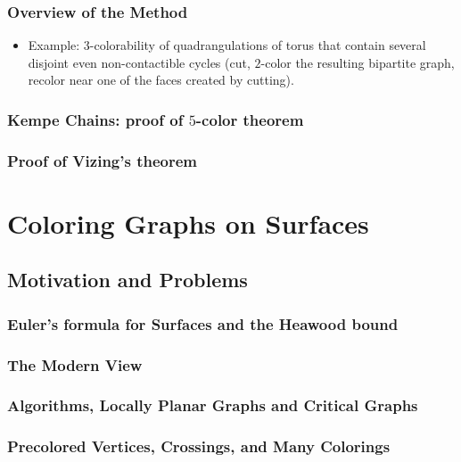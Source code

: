 \documentclass[12pt,twoside,openright,a4paper]{book}
\begin{document}
\section{Overview of the Method}

\begin{itemize}
\item Example: 3-colorability of quadrangulations of torus that contain several disjoint even non-contactible cycles
(cut, $2$-color the resulting bipartite graph, recolor near one of the faces created by cutting).
\end{itemize}

\section{Kempe Chains: proof of $5$-color theorem}

\section{Proof of Vizing's theorem}

\part{Coloring Graphs on Surfaces}

\chapter{Motivation and Problems}


\section{Euler's formula for Surfaces and the Heawood bound}

\section{The Modern View}

\section{Algorithms, Locally Planar Graphs and Critical Graphs}

\section{Precolored Vertices, Crossings, and Many Colorings}
\end{document}
